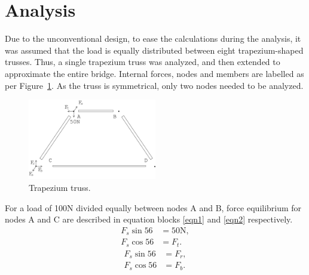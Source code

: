 \documentclass[12pt]{article}
\begin{document}
	\section{Analysis}
		Due to the unconventional design, to ease the calculations during the analysis, it was assumed that the load is equally distributed between eight trapezium-shaped trusses. Thus, a single trapezium truss was analyzed, and then extended to approximate the entire bridge. Internal forces, nodes and members are labelled as per Figure~\ref{trap}. As the truss is symmetrical, only two nodes needed to be analyzed.
		\begin{figure}[h!]
			\centering
			\includegraphics[width=0.5\textwidth]{trapanal}
			\caption{Trapezium truss.}
			\label{trap}
		\end{figure}
		For a load of 100N divided equally between nodes A and B, force equilibrium for nodes A and C are described in equation blocks \ref{eqn1} and \ref{eqn2} respectively.
		\begin{subequations}
			\begin{align}
				F_s \sin 56&=50\mathrm{N}, \\
				F_s \cos 56&=F_t.
			\end{align} \label{eqn1}
		\end{subequations}
		\begin{subequations}
			\begin{align}
				F_s \sin 56&=F_r, \\ 
				F_s \cos 56&=F_b.
			\end{align} \label{eqn2}
		\end{subequations}
\end{document}
